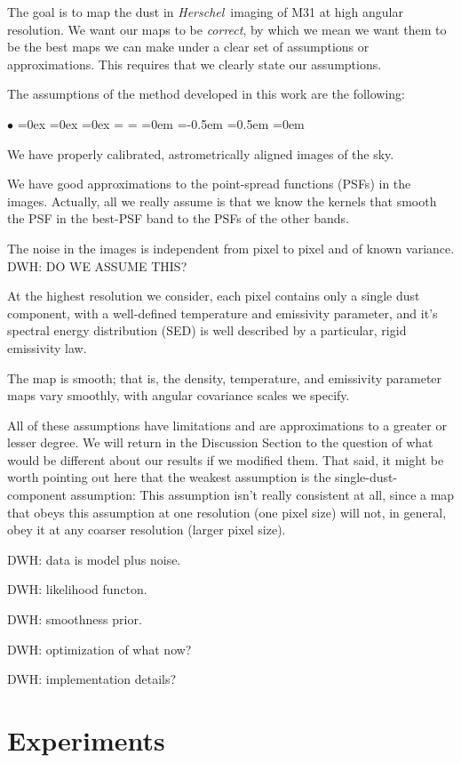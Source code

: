\documentclass[12pt, preprint]{aastex}
\newenvironment{hoggitemize}{\begin{list}{$\bullet$}{%
\topsep=0ex
\partopsep=0ex
\itemsep=0.5\parskip
\parsep=0ex
\leftmargin=\parindent
\rightmargin=\parindent
\listparindent=0em
\itemindent=-0.5em
\labelsep=0.5em
\labelwidth=0em}}{\end{list}}
\newcommand{\project}[1]{\textsl{#1}}
\newcommand{\Herschel}{\project{Herschel}}
\begin{document}
The goal is to map the dust in \Herschel\ imaging of M31 at high
angular resolution.
We want our maps to be \emph{correct}, by which we mean we want them
to be the best maps we can make under a clear set of assumptions or
approximations.
This requires that we clearly state our assumptions.

The assumptions of the method developed in this work are the
following:
\begin{hoggitemize}
\item We have properly calibrated, astrometrically aligned images of
  the sky.
\item We have good approximations to the point-spread functions (PSFs)
  in the images.  Actually, all we really assume is that we know the
  kernels that smooth the PSF in the best-PSF band to the PSFs of the
  other bands.
\item The noise in the images is independent from pixel to pixel and
  of known variance. DWH: DO WE ASSUME THIS?
\item At the highest resolution we consider, each pixel contains only
  a single dust component, with a well-defined temperature and
  emissivity parameter, and it's spectral energy distribution (SED)
  is well described by a particular, rigid emissivity law.
\item The map is smooth; that is, the density, temperature, and
  emissivity parameter maps vary smoothly, with angular covariance
  scales we specify.
\end{hoggitemize}
All of these assumptions have limitations and are approximations to a
greater or lesser degree.
We will return in the Discussion Section to the question of what would
be different about our results if we modified them.
That said, it might be worth pointing out here that the weakest
assumption is the single-dust-component assumption:
This assumption isn't really consistent at all, since a map that obeys
this assumption at one resolution (one pixel size) will not, in
general, obey it at any coarser resolution (larger pixel size).

DWH: data is model plus noise.

DWH: likelihood functon.

DWH: smoothness prior.

DWH: optimization of what now?

DWH: implementation details?

\section{Experiments}
\end{document}
